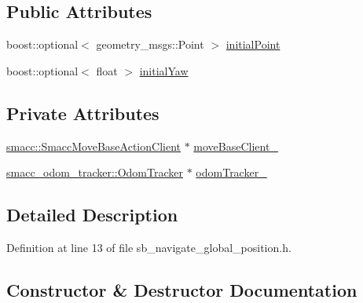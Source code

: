 \subsection*{Public Attributes}
\begin{DoxyCompactItemize}
\item 
boost\+::optional$<$ geometry\+\_\+msgs\+::\+Point $>$ \hyperlink{classsm__dance__bot_1_1SbNavigateGlobalPosition_ae4312e56f4859f5a4cd251fd136b3713}{initial\+Point}
\item 
boost\+::optional$<$ float $>$ \hyperlink{classsm__dance__bot_1_1SbNavigateGlobalPosition_af9096cd0b198b1f9ed2c826ca03949d4}{initial\+Yaw}
\end{DoxyCompactItemize}
\subsection*{Private Attributes}
\begin{DoxyCompactItemize}
\item 
\hyperlink{classsmacc_1_1SmaccMoveBaseActionClient}{smacc\+::\+Smacc\+Move\+Base\+Action\+Client} $\ast$ \hyperlink{classsm__dance__bot_1_1SbNavigateGlobalPosition_a61ddf443ec0ccc460ae594d35c50ac7f}{move\+Base\+Client\+\_\+}
\item 
\hyperlink{classsmacc__odom__tracker_1_1OdomTracker}{smacc\+\_\+odom\+\_\+tracker\+::\+Odom\+Tracker} $\ast$ \hyperlink{classsm__dance__bot_1_1SbNavigateGlobalPosition_a71058189c1f73baf77073ff1a64ff5ea}{odom\+Tracker\+\_\+}
\end{DoxyCompactItemize}


\subsection{Detailed Description}


Definition at line 13 of file sb\+\_\+navigate\+\_\+global\+\_\+position.\+h.



\subsection{Constructor \& Destructor Documentation}
